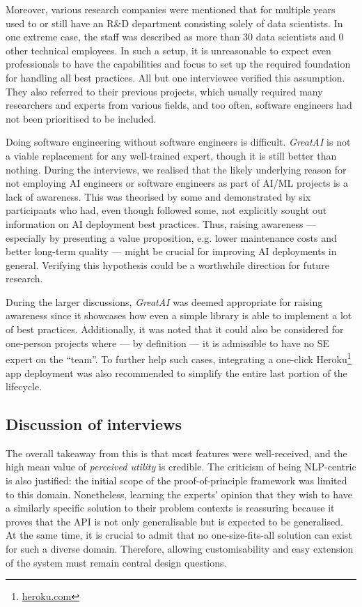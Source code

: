 Moreover, various research companies were mentioned that for multiple years used to or still have an R\&D department consisting solely of data scientists. In one extreme case, the staff was described as more than 30 data scientists and 0 other technical employees. In such a setup, it is unreasonable to expect even professionals to have the capabilities and focus to set up the required foundation for handling all best practices. All but one interviewee verified this assumption. They also referred to their previous projects, which usually required many researchers and experts from various fields, and too often, software engineers had not been prioritised to be included.

Doing software engineering without software engineers is difficult. \textit{GreatAI} is not a viable replacement for any well-trained expert, though it is still better than nothing. During the interviews, we realised that the likely underlying reason for not employing AI engineers or software engineers as part of AI/ML projects is a lack of awareness. This was theorised by some and demonstrated by six participants who had, even though followed some, not explicitly sought out information on AI deployment best practices. Thus, raising awareness --- especially by presenting a value proposition, e.g. lower maintenance costs and better long-term quality --- might be crucial for improving AI deployments in general. Verifying this hypothesis could be a worthwhile direction for future research.

During the larger discussions, \textit{GreatAI} was deemed appropriate for raising awareness since it showcases how even a simple library is able to implement a lot of best practices. Additionally, it was noted that it could also be considered for one-person projects where --- by definition --- it is admissible to have no SE expert on the ``team''. To further help such cases, integrating a one-click Heroku\footnote{\href{https://www.heroku.com/}{heroku.com}} app deployment was also recommended to simplify the entire last portion of the lifecycle. 

\subsection{Discussion of interviews}

The overall takeaway from this is that most features were well-received, and the high mean value of \textit{perceived utility} is credible. The criticism of being NLP-centric is also justified: the initial scope of the proof-of-principle framework was limited to this domain. Nonetheless, learning the experts' opinion that they wish to have a similarly specific solution to their problem contexts is reassuring because it proves that the API is not only generalisable but is expected to be generalised. At the same time, it is crucial to admit that no one-size-fits-all solution can exist for such a diverse domain. Therefore, allowing customisability and easy extension of the system must remain central design questions.

